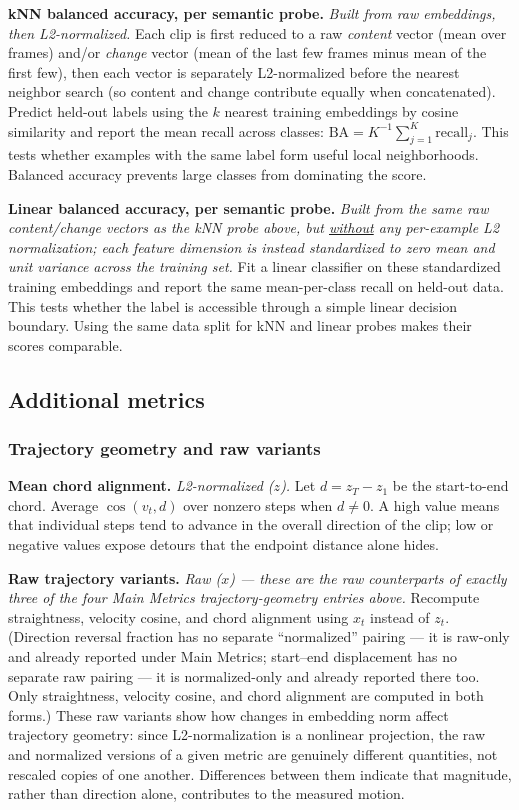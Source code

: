 \noindent\textbf{kNN balanced accuracy, per semantic probe.} \emph{Built from raw
embeddings, then L2-normalized.} Each clip is first reduced to a raw \emph{content}
vector (mean over frames) and/or \emph{change} vector (mean of the last few frames minus
mean of the first few), then each vector is separately L2-normalized before the nearest
neighbor search (so content and change contribute equally when concatenated). Predict
held-out labels using the $k$ nearest training embeddings by cosine similarity and report
the mean recall across classes: $\mathrm{BA}=K^{-1}\sum_{j=1}^{K}\mathrm{recall}_j$. This
tests whether examples with the same label form useful local neighborhoods. Balanced
accuracy prevents large classes from dominating the score.

\noindent\textbf{Linear balanced accuracy, per semantic probe.} \emph{Built from the
same raw content/change vectors as the kNN probe above, but \underline{without} any
per-example L2 normalization; each feature dimension is instead standardized to zero
mean and unit variance across the training set.} Fit a linear classifier on these
standardized training embeddings and report the same mean-per-class recall on held-out
data. This tests whether the label is accessible through a simple linear decision
boundary. Using the same data split for kNN and linear probes makes their scores
comparable.

\subsection{Additional metrics}

\subsubsection{Trajectory geometry and raw variants}

\noindent\textbf{Mean chord alignment.} \emph{L2-normalized ($z$).}
Let $d=z_T-z_1$ be the start-to-end chord. Average $\cos(v_t,d)$
over nonzero steps when $d\neq0$. A high value means that individual
steps tend to advance in the overall direction of the clip; low or
negative values expose detours that the endpoint distance alone hides.

\noindent\textbf{Raw trajectory variants.} \emph{Raw ($x$) --- these are the raw
counterparts of exactly three of the four Main Metrics trajectory-geometry entries
above.} Recompute straightness, velocity cosine, and chord alignment using $x_t$ instead
of $z_t$. (Direction reversal fraction has no separate ``normalized'' pairing --- it is
raw-only and already reported under Main Metrics; start--end displacement has no
separate raw pairing --- it is normalized-only and already reported there too. Only
straightness, velocity cosine, and chord alignment are computed in both forms.) These
raw variants show how changes in embedding norm affect trajectory geometry: since
L2-normalization is a nonlinear projection, the raw and normalized versions of a given
metric are genuinely different quantities, not rescaled copies of one another.
Differences between them indicate that magnitude, rather than direction alone,
contributes to the measured motion.

